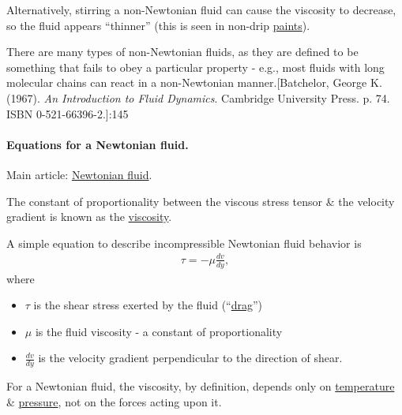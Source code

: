 \documentclass{article}
\begin{document}
Alternatively, stirring a non-Newtonian fluid can cause the viscosity to decrease, so the fluid appears ``thinner'' (this is seen in non-drip \href{https://en.wikipedia.org/wiki/Paint}{paints}).

There are many types of non-Newtonian fluids, as they are defined to be something that fails to obey a particular property - e.g., most fluids with long molecular chains can react in a non-Newtonian manner.[Batchelor, George K. (1967). \textit{An Introduction to Fluid Dynamics}. Cambridge University Press. p. 74. ISBN 0-521-66396-2.]:145

\paragraph{Equations for a Newtonian fluid.}
Main article: \href{https://en.wikipedia.org/wiki/Newtonian_fluid}{Newtonian fluid}.

%
The constant of proportionality between the viscous stress tensor \& the velocity gradient is known as the \href{https://en.wikipedia.org/wiki/Viscosity}{viscosity}.

A simple equation to describe incompressible Newtonian fluid behavior is
\begin{align*}
	\tau = -\mu\frac{dv}{dy},
\end{align*}
where
\begin{itemize}
	\item $\tau$ is the shear stress exerted by the fluid (``\href{https://en.wikipedia.org/wiki/Drag_(physics)}{drag}'')
	\item $\mu$ is the fluid viscosity - a constant of proportionality
	\item $\frac{dv}{dy}$ is the velocity gradient perpendicular to the direction of shear.
\end{itemize}
For a Newtonian fluid, the viscosity, by definition, depends only on \href{https://en.wikipedia.org/wiki/Temperature}{temperature} \& \href{https://en.wikipedia.org/wiki/Pressure}{pressure}, not on the forces acting upon it.
\end{document}
